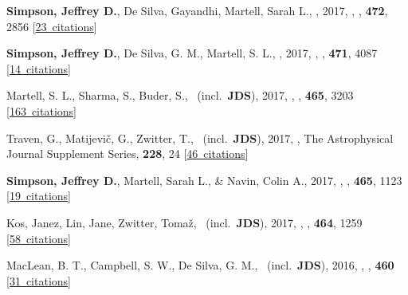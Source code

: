 \item[{\color{numcolor}\scriptsize12}] \textbf{Simpson, Jeffrey D.}, De Silva, Gayandhi, Martell, Sarah L., \etal, 2017, , \mnras, \textbf{472}, 2856 [\href{https://ui.adsabs.harvard.edu/#abs/2017MNRAS.472.2856S}{23~citations}]

\item[{\color{numcolor}\scriptsize11}] \textbf{Simpson, Jeffrey D.}, De Silva, G. M., Martell, S. L., \etal, 2017, , \mnras, \textbf{471}, 4087 [\href{https://ui.adsabs.harvard.edu/#abs/2017MNRAS.471.4087S}{14~citations}]

\item[{\color{numcolor}\scriptsize10}] Martell, S. L., Sharma, S., Buder, S., \etal\ (incl.\ \textbf{JDS}), 2017, , \mnras, \textbf{465}, 3203 [\href{https://ui.adsabs.harvard.edu/#abs/2017MNRAS.465.3203M}{163~citations}]

\item[{\color{numcolor}\scriptsize9}] Traven, G., Matijevi{\v{c}}, G., Zwitter, T., \etal\ (incl.\ \textbf{JDS}), 2017, , The Astrophysical Journal Supplement Series, \textbf{228}, 24 [\href{https://ui.adsabs.harvard.edu/#abs/2017ApJS..228...24T}{46~citations}]

\item[{\color{numcolor}\scriptsize8}] \textbf{Simpson, Jeffrey D.}, Martell, Sarah L., \& Navin, Colin A., 2017, , \mnras, \textbf{465}, 1123 [\href{https://ui.adsabs.harvard.edu/#abs/2017MNRAS.465.1123S}{19~citations}]

\item[{\color{numcolor}\scriptsize7}] Kos, Janez, Lin, Jane, Zwitter, Toma{\v{z}}, \etal\ (incl.\ \textbf{JDS}), 2017, , \mnras, \textbf{464}, 1259 [\href{https://ui.adsabs.harvard.edu/#abs/2017MNRAS.464.1259K}{58~citations}]

\item[{\color{numcolor}\scriptsize6}] MacLean, B. T., Campbell, S. W., De Silva, G. M., \etal\ (incl.\ \textbf{JDS}), 2016, , \mnras, \textbf{460} [\href{https://ui.adsabs.harvard.edu/#abs/2016MNRAS.460L..69M}{31~citations}]

